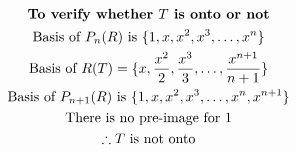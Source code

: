 \documentclass[english,course,fleqn]{lecture}
\newenvironment{qanda}{\begin{enumerate}\setlength{\parindent}{0pt}}{\medskip\end{enumerate}}
\begin{document}
\begin{qanda}
  \begin{gather*}
    \text{\textbf{To verify whether $T$ is onto or not}}\\
    \text{Basis of $P_{n}(R)$ is } \{1, x, x^{2}, x^{3}, \ldots, x^{n}\}\\
   \text{Basis of $R(T)$} = \{x, \frac{x^{2}}{2}, \frac{x^{3}}{3}, \ldots, \frac{x^{n+1}}{n+1}\}\\
    \text{Basis of $P_{n+1}(R)$ is } \{1, x, x^{2}, x^{3}, \ldots, x^{n}, x^{n+1}\}\\
    \text{There is no pre-image for 1}\\
    \therefore \text{$T$ is not onto}
  \end{gather*}

\end{qanda}
\end{document}
